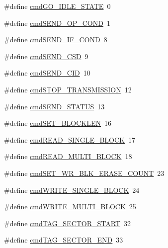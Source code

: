 \begin{DoxyCompactItemize}
\item 
\#define \hyperlink{_s_d-_s_p_i_8h_a02703e9cab5d95013737adbdbe93c0b0}{cmd\+G\+O\+\_\+\+I\+D\+L\+E\+\_\+\+S\+T\+A\+T\+E}~0
\item 
\#define \hyperlink{_s_d-_s_p_i_8h_a51321e259b663dc7ea15c4c43b9c54df}{cmd\+S\+E\+N\+D\+\_\+\+O\+P\+\_\+\+C\+O\+N\+D}~1
\item 
\#define \hyperlink{_s_d-_s_p_i_8h_a6b12e0aa6067fd1100de3375a72918a6}{cmd\+S\+E\+N\+D\+\_\+\+I\+F\+\_\+\+C\+O\+N\+D}~8
\item 
\#define \hyperlink{_s_d-_s_p_i_8h_a6909d22ca448c3785d1c65b31d93f205}{cmd\+S\+E\+N\+D\+\_\+\+C\+S\+D}~9
\item 
\#define \hyperlink{_s_d-_s_p_i_8h_ad780cd6b5490b6d4a1252a8412910bc3}{cmd\+S\+E\+N\+D\+\_\+\+C\+I\+D}~10
\item 
\#define \hyperlink{_s_d-_s_p_i_8h_a92488a89aa80daa3fa01cc0295956170}{cmd\+S\+T\+O\+P\+\_\+\+T\+R\+A\+N\+S\+M\+I\+S\+S\+I\+O\+N}~12
\item 
\#define \hyperlink{_s_d-_s_p_i_8h_a523f8e42b1b3dda864c422ed2b1e43a5}{cmd\+S\+E\+N\+D\+\_\+\+S\+T\+A\+T\+U\+S}~13
\item 
\#define \hyperlink{_s_d-_s_p_i_8h_a82811428d69219f685fe5e0437a7b945}{cmd\+S\+E\+T\+\_\+\+B\+L\+O\+C\+K\+L\+E\+N}~16
\item 
\#define \hyperlink{_s_d-_s_p_i_8h_ad0770ce608d10cbd323bdd45f677b7f5}{cmd\+R\+E\+A\+D\+\_\+\+S\+I\+N\+G\+L\+E\+\_\+\+B\+L\+O\+C\+K}~17
\item 
\#define \hyperlink{_s_d-_s_p_i_8h_a7912a0c224e11ce5cb668554cd9785e4}{cmd\+R\+E\+A\+D\+\_\+\+M\+U\+L\+T\+I\+\_\+\+B\+L\+O\+C\+K}~18
\item 
\#define \hyperlink{_s_d-_s_p_i_8h_aaeca80cb394e4cc0de547098849512dc}{cmd\+S\+E\+T\+\_\+\+W\+R\+\_\+\+B\+L\+K\+\_\+\+E\+R\+A\+S\+E\+\_\+\+C\+O\+U\+N\+T}~23
\item 
\#define \hyperlink{_s_d-_s_p_i_8h_a985e7c6e61fb0844cfe6e03019908757}{cmd\+W\+R\+I\+T\+E\+\_\+\+S\+I\+N\+G\+L\+E\+\_\+\+B\+L\+O\+C\+K}~24
\item 
\#define \hyperlink{_s_d-_s_p_i_8h_aac74c1e4a10eac10e017bc3bd2ee551f}{cmd\+W\+R\+I\+T\+E\+\_\+\+M\+U\+L\+T\+I\+\_\+\+B\+L\+O\+C\+K}~25
\item 
\#define \hyperlink{_s_d-_s_p_i_8h_a65242b334820603ef4054109ce2a91bf}{cmd\+T\+A\+G\+\_\+\+S\+E\+C\+T\+O\+R\+\_\+\+S\+T\+A\+R\+T}~32
\item 
\#define \hyperlink{_s_d-_s_p_i_8h_a6d014a8c52b6d808062758b56d326628}{cmd\+T\+A\+G\+\_\+\+S\+E\+C\+T\+O\+R\+\_\+\+E\+N\+D}~33
\item 

\end{DoxyCompactItemize}
